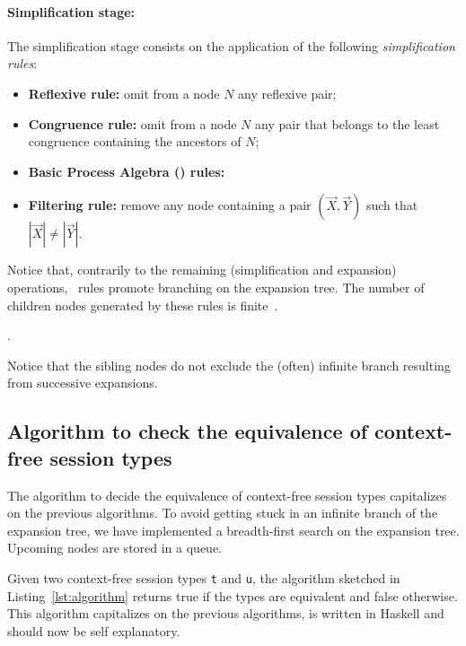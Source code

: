 \paragraph{Simplification stage:} The simplification stage consists on the application of the following \emph{simplification rules}:
\begin{itemize}
	\item {\bf Reflexive rule:} omit from a node $N$ any reflexive pair;
	\item {\bf Congruence rule:}  omit from a node $N$ any pair that 
	      belongs to the least congruence containing the ancestors of $N$;
	\item {\bf Basic Process Algebra (\BPA) rules:} 
	\item {\bf Filtering rule:} remove any node containing a pair
	       $(\vec X, \vec Y)$ such that $|\vec X|\neq |\vec Y|$.
\end{itemize}

Notice that, contrarily to the remaining (simplification and expansion) operations, 
\BPA\ rules promote branching on the expansion tree. The number of children nodes generated by these rules is finite~\cite{DBLP:journals/iandc/ChristensenHS95}.

. 

Notice that the sibling nodes do not exclude the (often) infinite branch 
resulting from successive expansions.

\subsection{Algorithm to check the equivalence of context-free session types}

The algorithm to decide the equivalence of context-free session 
types capitalizes on the previous algorithms. To avoid getting stuck in an 
infinite branch of the expansion tree, we have implemented 
a breadth-first search on the expansion tree. Upcoming nodes are stored
in a queue.

Given two context-free session types \lstinline|t| and \lstinline|u|,
the algorithm sketched in Listing~\ref{lst:algorithm} returns \textsf{true}
if the types are equivalent and \textsf{false} otherwise. 
This algorithm capitalizes on the previous algorithms, is written in Haskell 
and should now be self explanatory.

